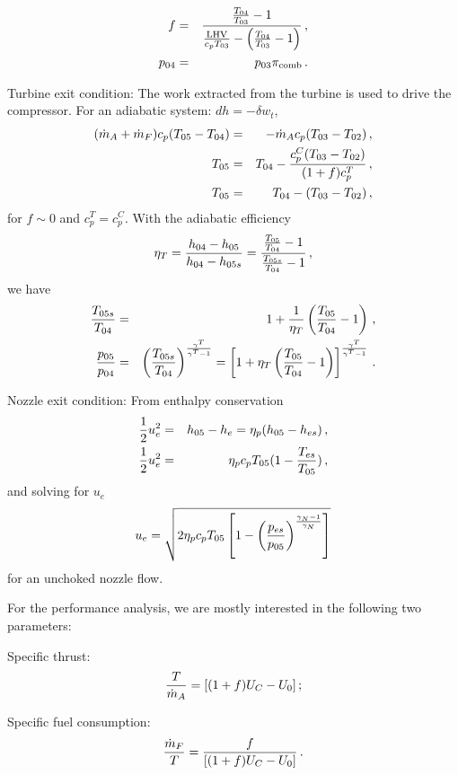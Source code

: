 \begin{itemizePacked}
\begin{eqnarray}
  f &=& {\frac{{\frac{T_{04}}{T_{03}}}-1}{{\frac{\text{LHV}}{c_p T_{03}}}-\left( {\frac{T_{04}}{T_{03}}}-1 \right)}}\,,\\
  p_{04} &=& p_{03} \pi_\text{comb}\,.
\end{eqnarray}
\item Turbine exit condition:
The work extracted from the turbine is used to drive the compressor. For an adiabatic system: $dh = - \delta w_t$,
\begin{eqnarray}
(\dot{m}_A+\dot{m}_F)c_p (T_{05}-T_{04}) &=& -\dot{m}_A c_p (T_{03}-T_{02})\,,\\
T_{05} &=& T_{04} - {\frac{c_p^C (T_{03}-T_{02})}{(1+f) c_p^T}}\,,\\
T_{05} &=& T_{04} - (T_{03}-T_{02})\,,
\end{eqnarray}
for $f \sim 0$ and $c_p^T = c_p^C$.
With the adiabatic efficiency
\begin{equation}
\eta_T = {\frac{h_{04}-h_{05}}{h_{04}-h_{05s}}} = {\frac{{\frac{T_{05}}{T_{04}}}-1}{{\frac{T_{05s}}{T_{04}}}-1}}\,,
\end{equation}
we have
\begin{eqnarray}
{\frac{T_{05s}}{T_{04}}} &=& 1+{\frac{1}{\eta_T}} \left( \frac{T_{05}}{T_{04}}-1 \right)\,,\\
{\frac{p_{05}}{p_{04}}} &=& \left({\frac{T_{05s}}{T_{04}}}\right)^{\frac{\gamma^T}{\gamma^T-1}} = \left[ 1+\eta_T \left( {\frac{T_{05}}{T_{04}}}-1 \right) \right]^{\frac{\gamma^T}{\gamma^T-1}}\,.
\end{eqnarray}
\item Nozzle exit condition: From enthalpy conservation
\begin{eqnarray}
{\frac{1}{2}}u_e^2 &=& h_{05} - h_e = \eta_p(h_{05}-h_{es})\,,\\
{\frac{1}{2}}u_e^2 &=& \eta_p c_p T_{05}(1-{\frac{T_{es}}{T_{05}}})\,,
\end{eqnarray}
and solving for $u_e$
\begin{equation}
u_e = \sqrt{2 \eta_p c_p T_{05}\left[1- \left({\frac{p_{es}}{p_{05}}}\right)^{\frac{\gamma_N-1}{\gamma_N}} \right]}
\end{equation}
for an unchoked nozzle flow.
\end{itemizePacked}

For the performance analysis, we are mostly interested in the following two parameters:
\begin{itemizePacked}
\item Specific thrust:
\begin{equation}
  {\frac{T}{\dot{m}_A}} = [(1+f)U_C - U_0]\,;
\end{equation}
\item Specific fuel consumption:
\begin{equation}
  {\frac{\dot{m}_F}{T}} = {\frac{f}{[(1+f)U_C-U_0]}}\,.
\end{equation}
\end{itemizePacked}

